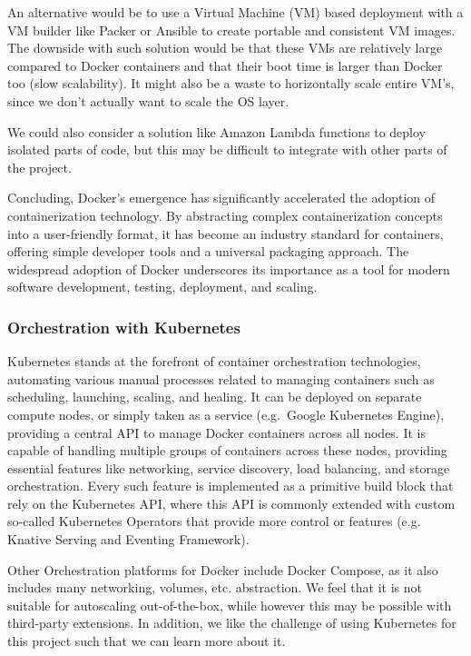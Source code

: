 \documentclass{report}
\begin{document}
    An alternative would be to use a Virtual Machine (VM) based deployment with a VM builder like Packer or Ansible to create portable and consistent VM images. The downside with such solution would be that these VMs are relatively large compared to Docker containers and that their boot time is larger than Docker too (slow scalability). It might also be a waste to horizontally scale entire VM's, since we don't actually want to scale the OS layer.

    We could also consider a solution like Amazon Lambda functions to deploy isolated parts of code, but this may be difficult to integrate with other parts of the project.

    Concluding, Docker's emergence has significantly accelerated the adoption of containerization technology. By abstracting complex containerization concepts into a user-friendly format, it has become an industry standard for containers, offering simple developer tools and a universal packaging approach. The widespread adoption of Docker underscores its importance as a tool for modern software development, testing, deployment, and scaling.

    \subsubsection{Orchestration with Kubernetes}
    Kubernetes stands at the forefront of container orchestration technologies, automating various manual processes related to managing containers such as scheduling, launching, scaling, and healing. It can be deployed on separate compute nodes, or simply taken as a service (e.g.\ Google Kubernetes Engine), providing a central API to manage Docker containers across all nodes. It is capable of handling multiple groups of containers across these nodes, providing essential features like networking, service discovery, load balancing, and storage orchestration. Every such feature is implemented as a primitive build block that rely on the Kubernetes API, where this API is commonly extended with custom so-called Kubernetes Operators that provide more control or features (e.g. Knative Serving and Eventing Framework).

    Other Orchestration platforms for Docker include Docker Compose, as it also includes many networking, volumes, etc. abstraction. We feel that it is not suitable for autoscaling out-of-the-box, while however this may be possible with third-party extensions. In addition, we like the challenge of using Kubernetes for this project such that we can learn more about it.
\end{document}
